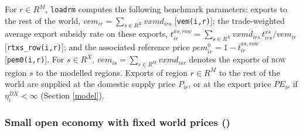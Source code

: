 For $r\in R^M$, \texttt{loadrm} computes the following benchmark parameters: exports to the rest of the world, $\textit{vem}_{ir}=\sum_{s\in R^X}\textit{vxmd}_{irs}$ [\texttt{vem(i,r)}]; the trade-weighted average export subsidy rate on these exports, $t^{xs,row}_{ir}=\sum_{s\in R^X}\textit{vxmd}_{irs}\,t^{xs}_{irs}/\textit{vem}_{ir}$ [\texttt{rtxs\_row(i,r)}]; and the associated reference price $\textit{pem}^0_{ir}=1-\overline{t}^{xs,row}_{ir}$ [\texttt{pem0(i,r)}].
For $s\in R^X$, $\textit{vem}_{is}=\sum_{r\in R^M}\textit{vxmd}_{isr}$ denotes the exports of \textsc{row} region $s$ to the modelled regions.
Exports of region $r\in R^M$ to the rest of the world are supplied at the domestic supply price $P_{ir}$, or at the export price $\mathit{PE}_{ir}$ if $\eta^{DX}_i<\infty$ (Section \ref{model}).

\subsubsection{Small open economy with fixed world prices (\SOE)}

